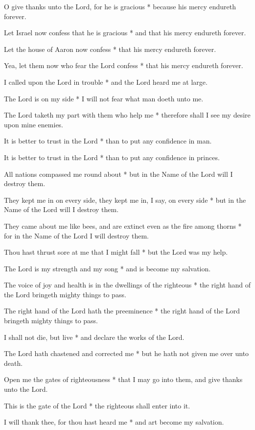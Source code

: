 O give thanks unto the Lord, for he is gracious * because his mercy endureth forever.

Let Israel now confess that he is gracious * and that his mercy endureth forever.

Let the house of Aaron now confess * that his mercy endureth forever.

Yea, let them now who fear the Lord confess * that his mercy endureth forever.

I called upon the Lord in trouble * and the Lord heard me at large.

The Lord is on my side * I will not fear what man doeth unto me.

The Lord taketh my part with them who help me * therefore shall I see my desire upon mine enemies.

It is better to trust in the Lord * than to put any confidence in man.

It is better to trust in the Lord * than to put any confidence in princes.

All nations compassed me round about * but in the Name of the Lord will I destroy them.

They kept me in on every side, they kept me in, I say, on every side * but in the Name of the Lord will I destroy them.

They came about me like bees, and are extinct even as the fire among thorns * for in the Name of the Lord I will destroy them.

Thou hast thrust sore at me that I might fall * but the Lord was my help.

The Lord is my strength and my song * and is become my salvation.

The voice of joy and health is in the dwellings of the righteous * the right hand of the Lord bringeth mighty things to pass.

The right hand of the Lord hath the preeminence * the right hand of the Lord bringeth mighty things to pass.

I shall not die, but live * and declare the works of the Lord.

The Lord hath chastened and corrected me * but he hath not given me over unto death.

Open me the gates of righteousness * that I may go into them, and give thanks unto the Lord.

This is the gate of the Lord * the righteous shall enter into it.

I will thank thee, for thou hast heard me * and art become my salvation.

